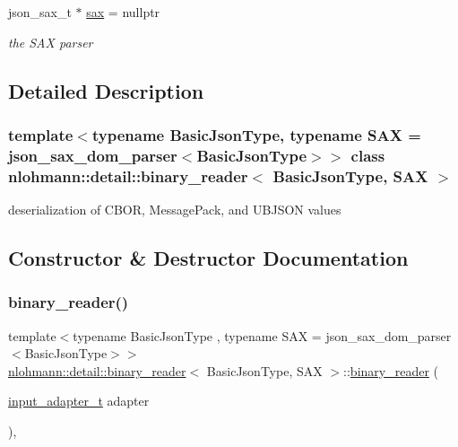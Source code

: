 \begin{DoxyCompactItemize}
\mbox{\label{classnlohmann_1_1detail_1_1binary__reader_ac9313177e414403e3e5784340d838b3f}} 
json\+\_\+sax\+\_\+t $\ast$ \mbox{\hyperlink{classnlohmann_1_1detail_1_1binary__reader_ac9313177e414403e3e5784340d838b3f}{sax}} = nullptr
\begin{DoxyCompactList}\small\item\em the S\+AX parser \end{DoxyCompactList}\end{DoxyCompactItemize}


\subsection{Detailed Description}
\subsubsection*{template$<$typename Basic\+Json\+Type, typename S\+AX = json\+\_\+sax\+\_\+dom\+\_\+parser$<$\+Basic\+Json\+Type$>$$>$\newline
class nlohmann\+::detail\+::binary\+\_\+reader$<$ Basic\+Json\+Type, S\+A\+X $>$}

deserialization of C\+B\+OR, Message\+Pack, and U\+B\+J\+S\+ON values 

\subsection{Constructor \& Destructor Documentation}
\mbox{\label{classnlohmann_1_1detail_1_1binary__reader_aed84f0302eb232d3b69f7653bef2337a}} 
\subsubsection{\texorpdfstring{binary\+\_\+reader()}{binary\_reader()}}
{\footnotesize\ttfamily template$<$typename Basic\+Json\+Type , typename S\+AX  = json\+\_\+sax\+\_\+dom\+\_\+parser$<$\+Basic\+Json\+Type$>$$>$ \\
\mbox{\hyperlink{classnlohmann_1_1detail_1_1binary__reader}{nlohmann\+::detail\+::binary\+\_\+reader}}$<$ Basic\+Json\+Type, S\+AX $>$\+::\mbox{\hyperlink{classnlohmann_1_1detail_1_1binary__reader}{binary\+\_\+reader}} (\begin{DoxyParamCaption}\item[{\mbox{\hyperlink{namespacenlohmann_1_1detail_ae132f8cd5bb24c5e9b40ad0eafedf1c2}{input\+\_\+adapter\+\_\+t}}}]{adapter }\end{DoxyParamCaption})\hspace{0.3cm}{\ttfamily [inline]}, {\ttfamily [explicit]}}



